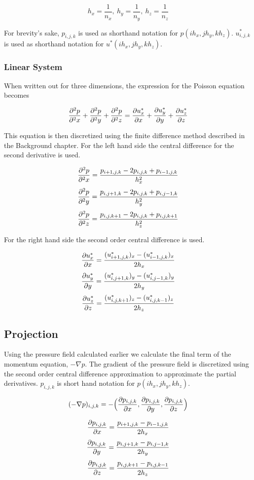 $$ h_x = \frac{1}{n_x}, ~ h_y = \frac{1}{n_y}, ~ h_z = \frac{1}{n_z} $$

For brevity's sake, $p_{i, j, k}$ is used as shorthand notation for 
$p(ih_x, jh_y, kh_z)$. $u^*_{i, j, k}$ is used as shorthand notation for
$u^*(ih_x, jh_y, kh_z)$.

\subsubsection{Linear System}

When written out for three dimensions, the expression for the Poisson equation
becomes

$$ \frac{\partial^2 p}{\partial^2 x} + \frac{\partial^2 p}{\partial^2 y} + \frac{\partial^2 p}{\partial^2 z} = \frac{\partial u^*_x}{\partial x} + \frac{\partial u^*_y}{\partial y} + \frac{\partial u^*_z}{\partial z} $$

This equation is then discretized using the finite difference method described
in the Background chapter. For the left hand side the central difference for 
the second derivative is used.

$$ \frac{\partial^2 p}{\partial^2 x} = \frac{p_{i+1, j, k} - 2p_{i, j, k} + p_{i-1, j, k}}{h_x^2} $$
$$ \frac{\partial^2 p}{\partial^2 y} = \frac{p_{i, j+1, k} - 2p_{i, j, k} + p_{i, j-1, k}}{h_y^2} $$
$$ \frac{\partial^2 p}{\partial^2 z} = \frac{p_{i, j, k+1} - 2p_{i, j, k} + p_{i, j, k+1}}{h_z^2} $$

For the right hand side the second order central difference is used.

$$ \frac{\partial u^*_x}{\partial x} = \frac{(u^*_{i+1, j, k})_x - (u^*_{i-1, j, k})_x}{2h_x} $$
$$ \frac{\partial u^*_y}{\partial y} = \frac{(u^*_{i, j+1, k})_y - (u^*_{i, j-1, k})_y}{2h_y} $$
$$ \frac{\partial u^*_z}{\partial z} = \frac{(u^*_{i, j, k+1})_z - (u^*_{i, j, k-1})_z}{2h_z} $$

\subsection{Projection}

Using the pressure field calculated earlier we calculate the final term of the 
momentum equation, $-\nabla p$. The gradient of the pressure field is discretized 
using the second order central difference approximation to approximate the 
partial derivatives. $p_{i,j,k}$ is short hand notation for $p(ih_x, jh_y, kh_z)$.

$$ (-\nabla p)_{i,j,k} = -\Big( \frac{\partial p_{i,j,k}}{\partial x}, \frac{\partial p_{i,j,k}}{\partial y}, \frac{\partial p_{i,j,k}}{\partial z} \Big) $$

$$ \frac{\partial p_{i,j,k}}{\partial x} = \frac{p_{i+1,j,k} - p_{i-1,j,k}}{2h_x} $$
$$ \frac{\partial p_{i,j,k}}{\partial y} = \frac{p_{i,j+1,k} - p_{i,j-1,k}}{2h_y} $$
$$ \frac{\partial p_{i,j,k}}{\partial z} = \frac{p_{i,j,k+1} - p_{i,j,k-1}}{2h_z} $$

